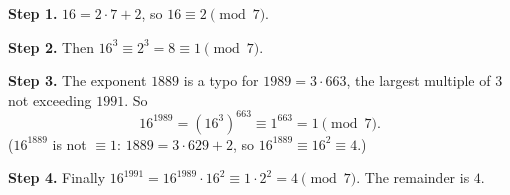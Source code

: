 \textbf{Step 1.} $16=2\cdot7+2$, so $16\equiv2\pmod7$.

\textbf{Step 2.} Then $16^3\equiv2^3=8\equiv1\pmod7$.

\textbf{Step 3.} The exponent $1889$ is a typo for $1989=3\cdot663$, the largest multiple of $3$ not exceeding $1991$. So
\[
16^{1989}=\left(16^3\right)^{663}\equiv1^{663}=1\pmod7 .
\]
($16^{1889}$ is not $\equiv1$: $1889=3\cdot629+2$, so $16^{1889}\equiv16^2\equiv4$.)

\textbf{Step 4.} Finally $16^{1991}=16^{1989}\cdot16^2\equiv1\cdot2^2=4\pmod7$. The remainder is $\boxed{4}$.
